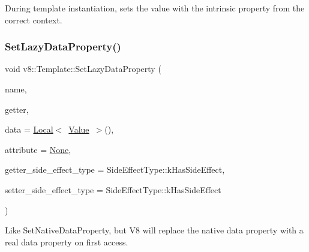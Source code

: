 During template instantiation, sets the value with the intrinsic property from the correct context. \mbox{\label{classv8_1_1Template_ab306ba858f4e71a25ebba4380ea5791f}} 
\subsubsection{\texorpdfstring{Set\+Lazy\+Data\+Property()}{SetLazyDataProperty()}}
{\footnotesize\ttfamily void v8\+::\+Template\+::\+Set\+Lazy\+Data\+Property (\begin{DoxyParamCaption}\item[{\mbox{\hyperlink{classv8_1_1Local}{Local}}$<$ \mbox{\hyperlink{classv8_1_1Name}{Name}} $>$}]{name,  }\item[{Accessor\+Name\+Getter\+Callback}]{getter,  }\item[{\mbox{\hyperlink{classv8_1_1Local}{Local}}$<$ \mbox{\hyperlink{classv8_1_1Value}{Value}} $>$}]{data = {\ttfamily \mbox{\hyperlink{classv8_1_1Local}{Local}}$<$~\mbox{\hyperlink{classv8_1_1Value}{Value}}~$>$()},  }\item[{\mbox{\hyperlink{namespacev8_a05f25f935e108a1ea2d150e274602b87}{Property\+Attribute}}}]{attribute = {\ttfamily \mbox{\hyperlink{namespacev8_a05f25f935e108a1ea2d150e274602b87a7ab4d58719c33b3ea2dfaefa29b111df}{None}}},  }\item[{\mbox{\hyperlink{namespacev8_a29711319c2b9fc7716d65faee2f7b9cb}{Side\+Effect\+Type}}}]{getter\+\_\+side\+\_\+effect\+\_\+type = {\ttfamily SideEffectType\+:\+:kHasSideEffect},  }\item[{\mbox{\hyperlink{namespacev8_a29711319c2b9fc7716d65faee2f7b9cb}{Side\+Effect\+Type}}}]{setter\+\_\+side\+\_\+effect\+\_\+type = {\ttfamily SideEffectType\+:\+:kHasSideEffect} }\end{DoxyParamCaption})}

Like Set\+Native\+Data\+Property, but V8 will replace the native data property with a real data property on first access. \mbox{\label{classv8_1_1Template_a771f6ca09e5c4789306f8638de5b99ed}} 
